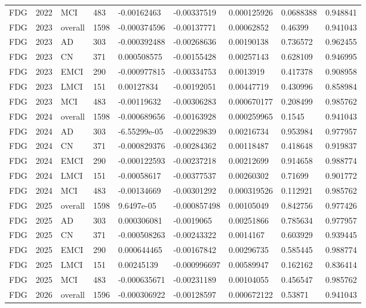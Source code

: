 \begin{landscape}
\begin{longtable}{lllllllll}
FDG & 2022 & MCI & 483 & -0.00162463 & -0.00337519 & 0.000125926 & 0.0688388 & 0.948841 \\
FDG & 2023 & overall & 1598 & -0.000374596 & -0.00137771 & 0.00062852 & 0.46399 & 0.941043 \\
FDG & 2023 & AD & 303 & -0.000392488 & -0.00268636 & 0.00190138 & 0.736572 & 0.962455 \\
FDG & 2023 & CN & 371 & 0.000508575 & -0.00155428 & 0.00257143 & 0.628109 & 0.946995 \\
FDG & 2023 & EMCI & 290 & -0.000977815 & -0.00334753 & 0.0013919 & 0.417378 & 0.908958 \\
FDG & 2023 & LMCI & 151 & 0.00127834 & -0.00192051 & 0.00447719 & 0.430996 & 0.858984 \\
FDG & 2023 & MCI & 483 & -0.00119632 & -0.00306283 & 0.000670177 & 0.208499 & 0.985762 \\
FDG & 2024 & overall & 1598 & -0.000689656 & -0.00163928 & 0.000259965 & 0.1545 & 0.941043 \\
FDG & 2024 & AD & 303 & -6.55299e-05 & -0.00229839 & 0.00216734 & 0.953984 & 0.977957 \\
FDG & 2024 & CN & 371 & -0.000829376 & -0.00284362 & 0.00118487 & 0.418648 & 0.919837 \\
FDG & 2024 & EMCI & 290 & -0.000122593 & -0.00237218 & 0.00212699 & 0.914658 & 0.988774 \\
FDG & 2024 & LMCI & 151 & -0.00058617 & -0.00377537 & 0.00260302 & 0.71699 & 0.901772 \\
FDG & 2024 & MCI & 483 & -0.00134669 & -0.00301292 & 0.000319526 & 0.112921 & 0.985762 \\
FDG & 2025 & overall & 1598 & 9.6497e-05 & -0.000857498 & 0.00105049 & 0.842756 & 0.977426 \\
FDG & 2025 & AD & 303 & 0.000306081 & -0.0019065 & 0.00251866 & 0.785634 & 0.977957 \\
FDG & 2025 & CN & 371 & -0.000508263 & -0.00243322 & 0.0014167 & 0.603929 & 0.939445 \\
FDG & 2025 & EMCI & 290 & 0.000644465 & -0.00167842 & 0.00296735 & 0.585445 & 0.988774 \\
FDG & 2025 & LMCI & 151 & 0.00245139 & -0.000996697 & 0.00589947 & 0.162162 & 0.836414 \\
FDG & 2025 & MCI & 483 & -0.000635671 & -0.00231189 & 0.00104055 & 0.456547 & 0.985762 \\
FDG & 2026 & overall & 1596 & -0.000306922 & -0.00128597 & 0.000672122 & 0.53871 & 0.941043 \\

\end{longtable}
\end{landscape}
